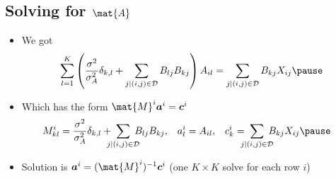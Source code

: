 
\begin{slide}
\section[-1]{Solving for $\mat{A}$}

\begin{PauseHighLight}
  \begin{itemize}
  \item We got
    \begin{align*}
      \sum_{l=1}^K \left( \frac{\sigma^2}{\sigma^2_A} \delta_{k,l}
        + \sum_{j| (i,j)\in\mathcal{D}}B_{lj}  B_{kj} \right) A_{il}
      = \sum_{j| (i,j)\in\mathcal{D}} B_{kj} X_{ij}\pause
    \end{align*}
  \item Which has the form $\mat{M}^i \bm{a}^i = \bm{c}^i$
    {\small
    \begin{align*}
      M^i_{kl} &= \frac{\sigma^2}{\sigma^2_A} \delta_{k,l}
        + \!\!\!\!\sum_{j| (i,j)\in\mathcal{D}}\!\!\!\! B_{lj}  B_{kj}, &
      a^i_l &= A_{il}, & c^i_k &= \!\!\!\!\sum_{j| (i,j)\in\mathcal{D}}\!\!\!\! B_{kj} X_{ij}\pause
    \end{align*}}
  \item Solution is $\bm{a}^i = (\mat{M}^i)^{-1} \bm{c}^i$ (one
    $K\times K$ solve for each row $i$)\pause
  \end{itemize}
\end{PauseHighLight}

\end{slide}


